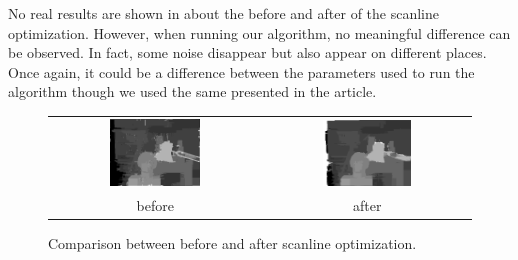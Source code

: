 \documentclass{ipol}
\begin{document}
No real results are shown in \cite{adCensus} about the before and after of the scanline optimization. However, when running our algorithm, no meaningful difference can be observed. In fact, some noise disappear but also appear on different places. Once again, it could be a 
difference between the parameters used to run the algorithm though we used the same presented in the article.

\begin{figure}[h]
\begin{center}	
\begin{tabular}{cc}
\includegraphics[width=0.45\textwidth]{Images/tsukuba/disparity_map_ADCensus_aggregated.png} &
\includegraphics[width=0.45\textwidth]{Images/tsukuba/disparity_map_ADCensus_aggregated_so.png} \\
before & after\\
\end{tabular}
	\caption{Comparison between before and after scanline optimization.}
	\label{censusPics}
\end{center}
\end{figure}
\end{document}
